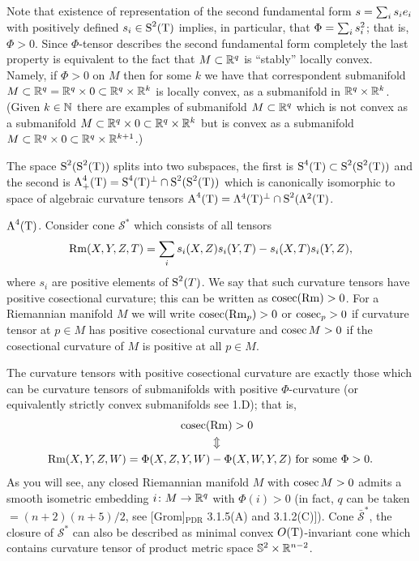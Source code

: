 \documentclass{article}
\begin{document}
Note that existence of representation of the second fundamental form
$s\z=\sum_i s_ie_i$ with
positively defined $s_i\in \S^2(\T)$
implies, in particular, that $\Phi\z=\sum_i s_i^2$;
that is, $\Phi> 0$.
Since $\Phi$-tensor describes the second fundamental form completely the
last property is equivalent to the fact that
$M\i \RR^q$ is ``stably'' locally convex.
Namely, if  $\Phi>0$ on $M$ then
for some $k$ we have
that correspondent submanifold $M\i \RR^q=\RR^q\times 0\i \RR^q\times \RR^k$
is locally convex, as a submanifold in $\RR^q\times \RR^k$.
(Given $k\in \NN$ there are examples of submanifold $M\i \RR^q$
which is not convex as a submanifold $M\i \RR^q\times 0\i \RR^q\times \RR^k$
but is convex as a submanifold $M\i \RR^q\times 0\i \RR^q\times \RR^{k+1}$.)


The space $\S^2(\S^2(\T))$ splits into two subspaces,
the first is $\S^4(\T)\i \S^2(\S^2(\T))$ and the second is
$\A^4_+(\T)=\S^4(\T)^\bot\cap \S^2(\S^2(\T))$
which is canonically isomorphic to space of algebraic curvature tensors
$\A^4(\T)=\Lambda^4(\T)^\bot\cap \S^2(\Lambda^2(\T)$.



$\A^4(\T)$. 
Consider cone $\mathcal{S}^*$ which consists of all tensors
$$\Rm(X,Y,Z,T)=\sum_i s_i(X,Z)s_i(Y,T)-s_i(X,T)s_i(Y,Z),$$ where
$s_i$  are positive elements of $\S^2(T)$. 
We say that such
curvature tensors have positive cosectional curvature;
this can be written as $\cosec (\Rm)>0$. 
For a Riemannian manifold $M$ we will write $\cosec (\Rm_p)>0$ or $\cosec_p>0$ if
curvature tensor at $p\in M$ has positive cosectional curvature and
$\cosec M>0$ if the cosectional curvature of $M$ is positive at
all $p\in M$.

The curvature tensors with positive cosectional curvature are exactly
those which can be curvature tensors of submanifolds with positive
$\Phi$-curvature (or equivalently strictly convex submanifolds see 1.D);
that is,
\begin{align*}
\cosec(&\Rm)>0
\\
&\Updownarrow
\\
\Rm(X,Y,Z,W)=\Phi(X,Z,Y,W)&-\Phi(X,W,Y,Z) \text{ for
some } \Phi>0.
\end{align*}
As you will see, any closed Riemannian
manifold $M$ with $\cosec M>0$ admits a smooth isometric embedding
$i\:M\to \RR^q$ with $\Phi(i)>0$ (in fact, $q$ can be taken
$=(n+2)(n+5)/2$, see [Grom]${}_{\text{PDR}}$ 3.1.5(A) and
3.1.2(C)]). 
Cone $\bar{\mathcal{S}}^*$, the closure of $\mathcal{S}^*$ can also be
described as minimal convex $O(\T)$-invariant cone which contains
curvature tensor of product metric space $\SS^2\times \RR^{n-2}$.
\end{document}
